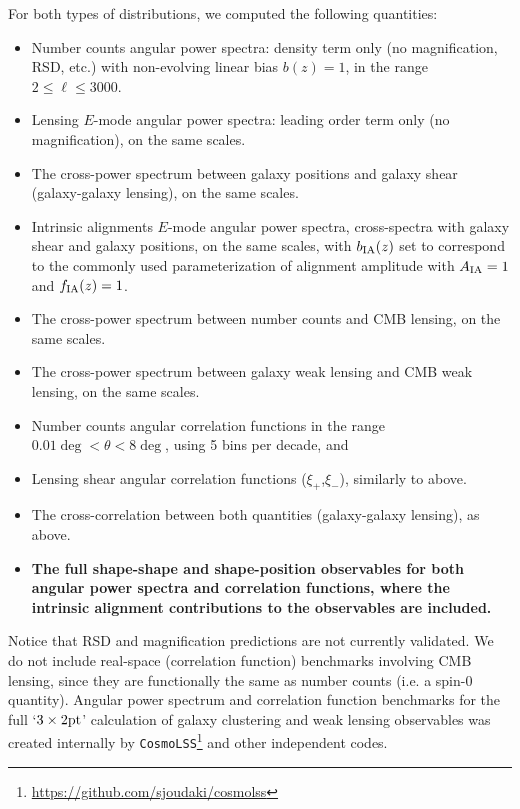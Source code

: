 \documentclass[\docopts]{\docclass}
\begin{document}
For both types of distributions, we computed the following quantities:
\begin{itemize}
\item Number counts angular power spectra: density term only (no magnification, RSD, etc.) with non-evolving linear bias $b(z) = 1$, in the range $2 \leq \ell \leq 3000$.
\item Lensing $E$-mode angular power spectra: leading order term only (no magnification), on the same scales.
\item The cross-power spectrum between galaxy positions and galaxy shear (galaxy-galaxy lensing), on the same scales.
\item Intrinsic alignments $E$-mode angular power spectra, cross-spectra with galaxy shear and galaxy positions, on the same scales, with $b_{\rm IA}(z)$ set to correspond to the commonly used parameterization of alignment amplitude \citep[e.g.][]{Joudaki18} with $A_{\rm IA}=1$ and $f_{\rm IA}(z)=1$.
\item The cross-power spectrum between number counts and CMB lensing, on the same scales.
\item The cross-power spectrum between galaxy weak lensing and CMB weak lensing, on the same scales.
\item Number counts angular correlation functions in the range $0.01 \deg < \theta < 8 \deg$, using 5 bins per decade, and
\item Lensing shear angular correlation functions ($\xi_+$,$\xi_-$), similarly to above.
\item The cross-correlation between both quantities (galaxy-galaxy lensing), as above.
\item {\bf The full shape-shape and shape-position observables for both angular power spectra and correlation functions, where the intrinsic alignment contributions to the observables are included.} 
\end{itemize}
Notice that RSD and magnification predictions are not currently validated. We do not include real-space (correlation function) benchmarks involving CMB lensing, since they are functionally the same as number counts (i.e. a spin-0 quantity). Angular power spectrum and correlation function benchmarks for the full `$3 \times 2{\rm{pt}}$' calculation of galaxy clustering and weak lensing observables was created internally by {\tt CosmoLSS}\footnote{\url{https://github.com/sjoudaki/cosmolss}} and other independent codes.
\end{document}
